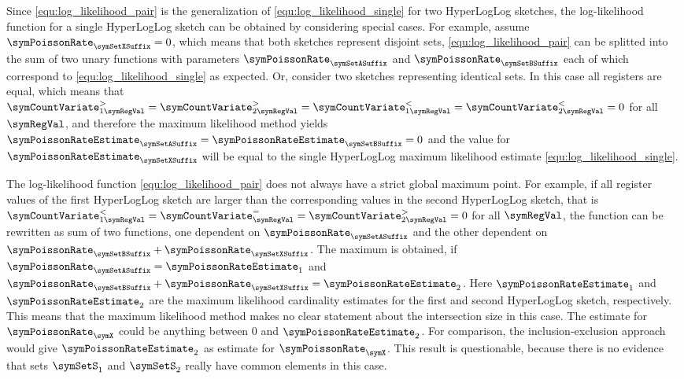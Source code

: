\documentclass[a4paper]{scrartcl}
\begin{document}
Since \eqref{equ:log_likelihood_pair} is the generalization of \eqref{equ:log_likelihood_single} for two HyperLogLog sketches, the log-likelihood function for a single HyperLogLog sketch can be obtained by considering special cases. For example, assume $\symPoissonRate_\symSetXSuffix=0$, which means that both sketches represent disjoint sets, \eqref{equ:log_likelihood_pair} can be splitted into the sum of two unary functions with parameters $\symPoissonRate_\symSetASuffix$ and $\symPoissonRate_\symSetBSuffix$ each of which correspond to \eqref{equ:log_likelihood_single} as expected. Or, consider two sketches representing identical sets. In this case all registers are equal, which means  that $\symCountVariate^{>}_{1\symRegVal}=\symCountVariate^{>}_{2\symRegVal}=
\symCountVariate^{<}_{1\symRegVal}=\symCountVariate^{<}_{2\symRegVal}=0$ for all $\symRegVal$, and therefore the maximum likelihood method yields $\symPoissonRateEstimate_\symSetASuffix = \symPoissonRateEstimate_\symSetBSuffix = 0$ and the value for $\symPoissonRateEstimate_\symSetXSuffix$ will be equal to the single HyperLogLog maximum likelihood estimate \eqref{equ:log_likelihood_single}.

The log-likelihood function \eqref{equ:log_likelihood_pair} does not always have a strict global maximum point. For example, if all register values of the first HyperLogLog sketch are larger than the corresponding values in the second HyperLogLog sketch, that is $\symCountVariate_{1\symRegVal}^{<}
=
\symCountVariate_{\symRegVal}^{=}
=
\symCountVariate_{2\symRegVal}^{>}
=
0$ for all $\symRegVal$, the function can be rewritten as sum of two functions, one dependent on $\symPoissonRate_\symSetASuffix$ and the other dependent on $\symPoissonRate_\symSetBSuffix+\symPoissonRate_\symSetXSuffix$. 
The maximum is obtained, if $\symPoissonRate_\symSetASuffix = \symPoissonRateEstimate_1$ and $\symPoissonRate_\symSetBSuffix+\symPoissonRate_\symSetXSuffix = \symPoissonRateEstimate_2$. Here $\symPoissonRateEstimate_1$ and $\symPoissonRateEstimate_2$ are the maximum likelihood cardinality estimates for the first and second HyperLogLog sketch, respectively. This means that the maximum likelihood method makes no clear statement about the intersection size in this case. The estimate for $\symPoissonRate_\symX$ could be anything between 0 and $\symPoissonRateEstimate_2$. For comparison, the inclusion-exclusion approach would give $\symPoissonRateEstimate_2$ as estimate for $\symPoissonRate_\symX$. This result is questionable, because there is no evidence that sets $\symSetS_1$ and $\symSetS_2$ really have common elements in this case.
\end{document}
